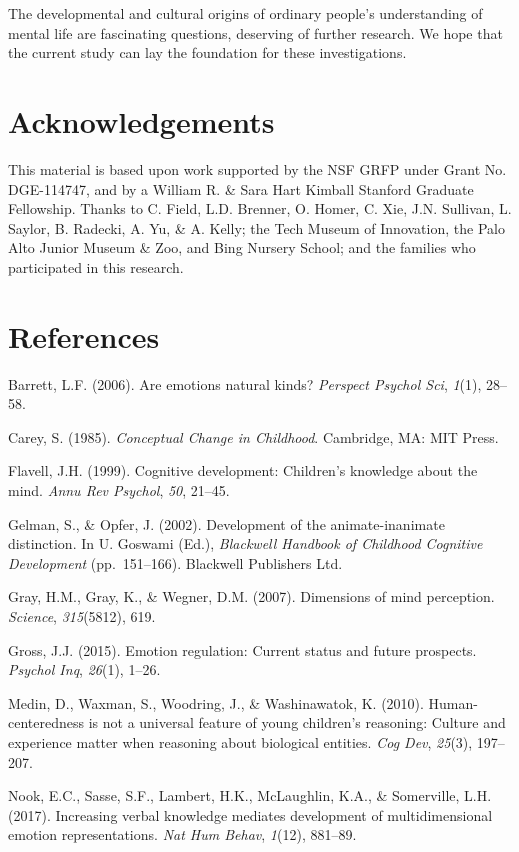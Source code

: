 \documentclass[10pt, letterpaper]{article}
\begin{document}
The developmental and cultural origins of ordinary people's
understanding of mental life are fascinating questions, deserving of
further research. We hope that the current study can lay the foundation
for these investigations.

\section{Acknowledgements}\label{acknowledgements}

This material is based upon work supported by the NSF GRFP under Grant
No. DGE-114747, and by a William R. \& Sara Hart Kimball Stanford
Graduate Fellowship. Thanks to C. Field, L.D. Brenner, O. Homer, C. Xie,
J.N. Sullivan, L. Saylor, B. Radecki, A. Yu, \& A. Kelly; the Tech
Museum of Innovation, the Palo Alto Junior Museum \& Zoo, and Bing
Nursery School; and the families who participated in this research.

\section{References}\label{references}

Barrett, L.F. (2006). Are emotions natural kinds? \emph{Perspect Psychol
Sci}, \emph{1}(1), 28--58.

Carey, S. (1985). \emph{Conceptual Change in Childhood}. Cambridge, MA:
MIT Press.

Flavell, J.H. (1999). Cognitive development: Children's knowledge about
the mind. \emph{Annu Rev Psychol}, \emph{50}, 21--45.

Gelman, S., \& Opfer, J. (2002). Development of the animate-inanimate
distinction. In U. Goswami (Ed.), \emph{Blackwell Handbook of Childhood
Cognitive Development} (pp.~151--166). Blackwell Publishers Ltd.

Gray, H.M., Gray, K., \& Wegner, D.M. (2007). Dimensions of mind
perception. \emph{Science}, \emph{315}(5812), 619.

Gross, J.J. (2015). Emotion regulation: Current status and future
prospects. \emph{Psychol Inq}, \emph{26}(1), 1--26.

Medin, D., Waxman, S., Woodring, J., \& Washinawatok, K. (2010).
Human-centeredness is not a universal feature of young children's
reasoning: Culture and experience matter when reasoning about biological
entities. \emph{Cog Dev}, \emph{25}(3), 197--207.

Nook, E.C., Sasse, S.F., Lambert, H.K., McLaughlin, K.A., \& Somerville,
L.H. (2017). Increasing verbal knowledge mediates development of
multidimensional emotion representations. \emph{Nat Hum Behav},
\emph{1}(12), 881--89.
\end{document}
